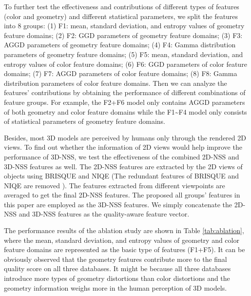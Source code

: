 \documentclass[lettersize,journal]{IEEEtran}
\begin{document}
{
To further test the effectiveness and contributions of different types of features (color and geometry) and different statistical parameters, we split the features into 8 groups: (1) F1: mean, standard deviation, and entropy values of geometry feature domains; (2) F2: GGD parameters of geometry feature domains; (3) F3: AGGD parameters of geometry feature domains; (4) F4: Gamma distribution parameters of geometry feature domains; (5) F5: mean, standard deviation, and entropy values of color feature domains; (6) F6: GGD parameters of color feature domains; (7) F7: AGGD parameters of color feature domains; (8) F8: Gamma distribution parameters of color feature domains. Then we can analyze the features' contributions by obtaining the performance of different combinations of feature groups. For example, the F2+F6 model only contains AGGD parameters of both geometry and color feature domains while the F1\~{}F4 model only consists of statistical parameters of geometry feature domains.


Besides, most 3D models are perceived by humans only through the rendered 2D views. To find out whether the information of 2D views would help improve the performance of 3D-NSS, we test the effectiveness of the combined 2D-NSS and 3D-NSS features as well. The 2D-NSS features are extracted by the 2D views of objects using BRISQUE \cite{brisque} and NIQE \cite{niqe} (The redundant features of BRISQUE and NIQE are removed ). The features extracted from different viewpoints are averaged to get the final 2D-NSS features. The proposed all groups' features in this paper are employed as the 3D-NSS features. We simply concatenate the 2D-NSS and 3D-NSS features as the quality-aware feature vector.

The performance results of the ablation study are shown in Table \ref{tab:ablation}, where the mean, standard deviation, and entropy values of geometry and color feature domains are represented as the basic type of features (F1+F5). It can be obviously observed that the geometry features contribute more to the final quality score on all three databases. It might be because all three databases introduce more types of geometry distortions than color distortions and the geometry information weighs more in the human perception of 3D models.





}
\end{document}
